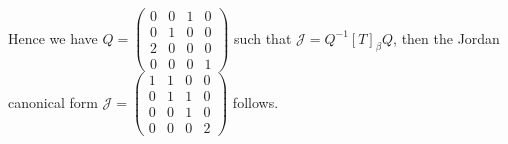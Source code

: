 \begin{Exercise}
\begin{enumerate}[(a)]
\begin{solution}
Hence we have $Q = \begin{pmatrix}
0 & 0 & 1 & 0 \\
0 & 1 & 0 & 0 \\
2 & 0 & 0 & 0 \\
0 & 0 & 0 & 1
\end{pmatrix}$ such that $\mathcal{J} = Q^{-1} [T]_{\beta} Q$, then the Jordan canonical form $\mathcal{J} = \begin{pmatrix}
1 & 1 & 0 & 0 \\
0 & 1 & 1 & 0 \\
0 & 0 & 1 & 0 \\
0 & 0 & 0 & 2
\end{pmatrix}$ follows.


\end{solution}
\end{enumerate}
\end{Exercise}